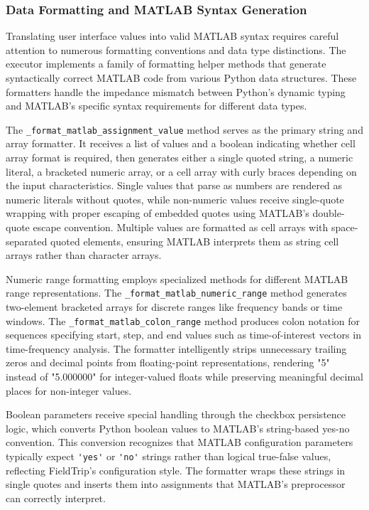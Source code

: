 \documentclass[12pt]{report}
\begin{document}
\subsubsection{Data Formatting and MATLAB Syntax Generation}

Translating user interface values into valid MATLAB syntax requires careful attention to numerous formatting conventions and data type distinctions. The executor implements a family of formatting helper methods that generate syntactically correct MATLAB code from various Python data structures. These formatters handle the impedance mismatch between Python's dynamic typing and MATLAB's specific syntax requirements for different data types.

The \verb|_format_matlab_assignment_value| method serves as the primary string and array formatter. It receives a list of values and a boolean indicating whether cell array format is required, then generates either a single quoted string, a numeric literal, a bracketed numeric array, or a cell array with curly braces depending on the input characteristics. Single values that parse as numbers are rendered as numeric literals without quotes, while non-numeric values receive single-quote wrapping with proper escaping of embedded quotes using MATLAB's double-quote escape convention. Multiple values are formatted as cell arrays with space-separated quoted elements, ensuring MATLAB interprets them as string cell arrays rather than character arrays.

Numeric range formatting employs specialized methods for different MATLAB range representations. The \verb|_format_matlab_numeric_range| method generates two-element bracketed arrays for discrete ranges like frequency bands or time windows. The \verb|_format_matlab_colon_range| method produces colon notation for sequences specifying start, step, and end values such as time-of-interest vectors in time-frequency analysis. The formatter intelligently strips unnecessary trailing zeros and decimal points from floating-point representations, rendering "5" instead of "5.000000" for integer-valued floats while preserving meaningful decimal places for non-integer values.

Boolean parameters receive special handling through the checkbox persistence logic, which converts Python boolean values to MATLAB's string-based yes-no convention. This conversion recognizes that MATLAB configuration parameters typically expect \verb|'yes'| or \verb|'no'| strings rather than logical true-false values, reflecting FieldTrip's configuration style. The formatter wraps these strings in single quotes and inserts them into assignments that MATLAB's preprocessor can correctly interpret.
\end{document}

